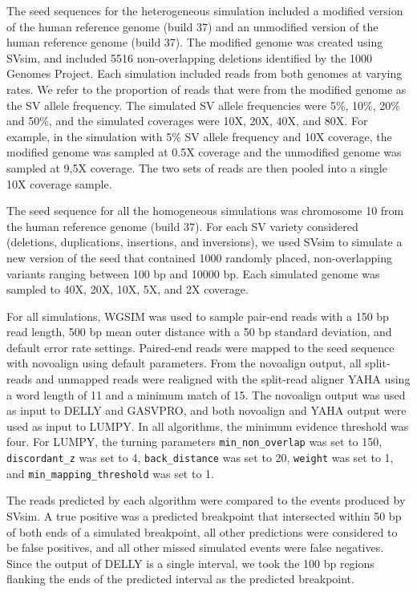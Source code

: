 \documentclass[10pt]{bmc_article}
\newenvironment{bmcformat}{\begin{raggedright}\baselineskip20pt\sloppy\setboolean{publ}{false}}{\end{raggedright}\baselineskip20pt\sloppy}
\begin{document}
\begin{bmcformat}
The seed sequences for the heterogeneous simulation included a modified version
of the human reference genome (build 37) and an unmodified version of the human
reference genome (build 37).  The modified genome was created using SVsim, and
included 5516 non-overlapping deletions identified by the 1000 Genomes Project.
Each simulation included reads from both genomes at varying rates.  We refer to
the proportion of reads that were from the modified genome as the SV allele
frequency.  The simulated SV allele frequencies were 5\%, 10\%, 20\% and 50\%,
and the simulated coverages were 10X, 20X, 40X, and 80X.  For example, in the
simulation with 5\% SV allele frequency and 10X coverage, the modified genome
was sampled at 0.5X coverage and the unmodified genome was sampled at 9,5X
coverage.  The two sets of reads are then pooled into a single 10X coverage
sample.

The seed sequence for all the homogeneous simulations was chromosome 10 from the
human reference genome (build 37). For each SV variety considered (deletions,
duplications, insertions, and inversions), we used SVsim to simulate a new
version of the seed that contained 1000 randomly placed, non-overlapping
variants ranging between 100 bp and 10000 bp. Each simulated genome was sampled
to 40X, 20X, 10X, 5X, and 2X coverage.

For all simulations, WGSIM was used to sample pair-end reads with a 150 bp read
length, 500 bp mean outer distance with a 50 bp standard deviation, and default
error rate settings.  Paired-end reads were mapped to the seed sequence with
novoalign using default parameters. From the novoalign output, all split-reads
and unmapped reads were realigned with the split-read aligner YAHA using a word
length of 11 and a minimum match of 15. The novoalign output was used as input
to DELLY and GASVPRO, and both novoalign and YAHA output were used as input to
LUMPY. In all algorithms, the minimum evidence threshold was four. For LUMPY,
the turning parameters {\tt min\_non\_overlap} was set to 150, 
{\tt discordant\_z} was set to 4, {\tt back\_distance} was set to 20, 
{\tt weight} was set to 1, and {\tt min\_mapping\_threshold} was set to 1.

The reads predicted by each algorithm were compared to the events produced by
SVsim. A true positive was a predicted breakpoint that intersected within 50 bp
of both ends of a simulated breakpoint, all other predictions were considered to
be false positives, and all other missed simulated events were false negatives.
Since the output of DELLY is a single interval, we took the 100 bp regions
flanking the ends of the predicted interval as the predicted breakpoint.


\end{bmcformat}
\end{document}

